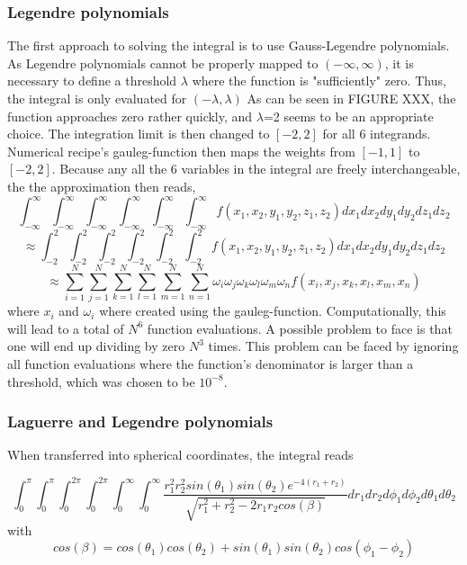 \documentclass[10pt,a4paper]{article}
\begin{document}
\subsubsection{Legendre polynomials}
The first approach to solving the integral is to use Gauss-Legendre polynomials. As Legendre polynomials cannot be properly mapped to $(-\infty,\infty)$, it is necessary to define a threshold $\lambda$ where the function is "sufficiently" zero. Thus, the integral is only evaluated for $(-\lambda,\lambda)$ As can be seen in FIGURE XXX, the function approaches zero rather quickly, and $\lambda$=2 seems to be an appropriate choice. The integration limit is then changed to $[-2,2]$ for all 6 integrands. Numerical recipe's gauleg-function \cite{press1992numerical} then maps the weights from $[-1,1]$ to $[-2,2]$. Because any all the 6 variables in the integral are freely interchangeable, the the approximation then reads, 
$$\int_{-\infty}^{\infty}\int_{-\infty}^{\infty}\int_{-\infty}^{\infty}\int_{-\infty}^{\infty}\int_{-\infty}^{\infty}\int_{-\infty}^{\infty}f(x_1,x_2,y_1,y_2,z_1,z_2)dx_1dx_2dy_1dy_2dz_1dz_2$$
$$\approx\int_{-2}^{2}\int_{-2}^{2}\int_{-2}^{2}\int_{-2}^{2}\int_{-2}^{2}\int_{-2}^{2}f(x_1,x_2,y_1,y_2,z_1,z_2)dx_1dx_2dy_1dy_2dz_1dz_2 $$
$$\approx\sum_{i=1}^{N}\sum_{j=1}^{N}\sum_{k=1}^{N}\sum_{l=1}^{N}\sum_{m=1}^{N}\sum_{n=1}^{N}\omega_i\omega_j\omega_k\omega_l\omega_m\omega_nf(x_i,x_j,x_k,x_l,x_m,x_n)$$
where $x_i$ and $\omega_i$ where created using the gauleg-function. 
Computationally, this will lead to a total of $N^6$ function evaluations. A possible problem to face is that one will end up dividing by zero $N^3$ times. This problem can be faced by ignoring all function evaluations where the function's denominator is larger than a threshold, which was chosen to be $10^{-8}.$
\subsubsection{Laguerre and Legendre polynomials}
When transferred into spherical coordinates, the integral reads 

$$
\int_{0}^{\pi}\int_{0}^{\pi}\int_{0}^{2\pi}\int_{0}^{2\pi}\int_{0}^{\infty}\int_{0}^{\infty}
\frac{r_1^2r_2^2sin(\theta_1)sin(\theta_2)e^{-4(r_1+r_2)}}{\sqrt{r_1^2+r_2^2-2r_1r_2cos(\beta)}}dr_1dr_2d\phi_1d\phi_2d\theta_1d\theta_2
$$
with
$$
cos(\beta)=cos(\theta_1)cos(\theta_2)+sin(\theta_1)sin(\theta_2)cos(\phi_1-\phi_2)
$$
\end{document}

